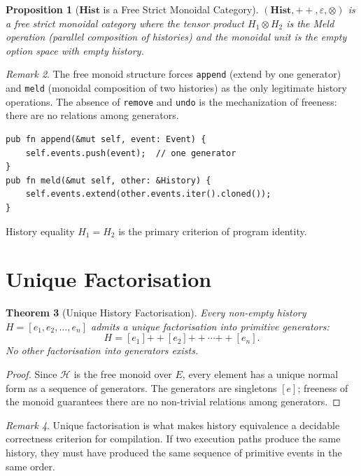 \documentclass[12pt, a4paper, openany]{book}
\theoremstyle{plain}
\newtheorem{theorem}{Theorem}[chapter]
\newtheorem{proposition}[theorem]{Proposition}
\theoremstyle{definition}
\theoremstyle{remark}
\newtheorem{remark}[theorem]{Remark}
\newcommand{\Hist}{\mathbf{Hist}}
\newcommand{\calH}{\mathcal{H}}
\begin{document}
\begin{proposition}[$\Hist$ is a Free Strict Monoidal Category]
$(\Hist, \mathbin{++}, \varepsilon, \otimes)$ is a free strict monoidal category
where the tensor product $H_1 \otimes H_2$ is the Meld operation (parallel
composition of histories) and the monoidal unit is the empty option space with
empty history.
\end{proposition}

\begin{remark}
The free monoid structure forces \texttt{append} (extend by one generator) and
\texttt{meld} (monoidal composition of two histories) as the only legitimate
history operations. The absence of \texttt{remove} and \texttt{undo} is the
mechanization of freeness: there are no relations among generators.
\begin{lstlisting}[style=rust, caption={History as free monoid in Rust}]
pub fn append(&mut self, event: Event) {
    self.events.push(event);  // one generator
}
pub fn meld(&mut self, other: &History) {
    self.events.extend(other.events.iter().cloned());
}
\end{lstlisting}
History equality $H_1 = H_2$ is the primary criterion of program identity.
\end{remark}

\section{Unique Factorisation}

\begin{theorem}[Unique History Factorisation]
Every non-empty history $H = [e_1, e_2, \ldots, e_n]$ admits a unique
factorisation into primitive generators:
\[
H = [e_1] \mathbin{++} [e_2] \mathbin{++} \cdots \mathbin{++} [e_n].
\]
No other factorisation into generators exists.
\end{theorem}

\begin{proof}
Since $\calH$ is the free monoid over $E$, every element has a unique normal form
as a sequence of generators. The generators are singletons $[e]$; freeness of the
monoid guarantees there are no non-trivial relations among generators.
\end{proof}

\begin{remark}
Unique factorisation is what makes history equivalence a decidable correctness
criterion for compilation. If two execution paths produce the same history, they
must have produced the same sequence of primitive events in the same order.
\end{remark}
\end{document}
